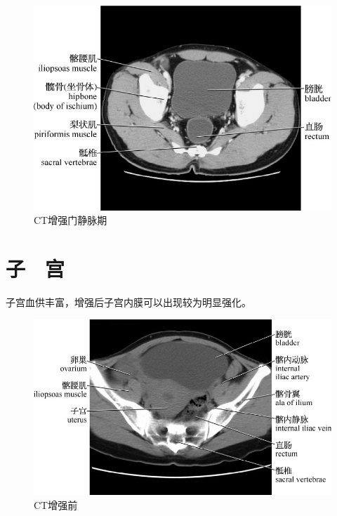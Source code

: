 \begin{figure}[!htbp]
 \centering
 \includegraphics{./images/Image00157.jpg}
 \captionsetup{justification=centering}
 \caption{CT增强门静脉期}
  \end{figure} 
 \FloatBarrier

\section{子　宫}

子宫血供丰富，增强后子宫内膜可以出现较为明显强化。

\begin{figure}[!htbp]
 \centering
 \includegraphics{./images/Image00158.jpg}
 \captionsetup{justification=centering}
 \caption{CT增强前}
  \end{figure} 
 \FloatBarrier

